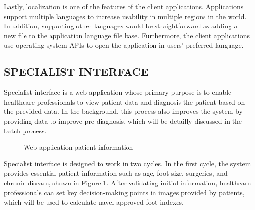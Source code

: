 Lastly, localization is one of the features of the client applications. Applications support multiple languages to increase usability in multiple regions in the world. In addition, supporting other languages would be straightforward as adding a new file to the application language file base. Furthermore, the client applications use operating system APIs to open the application in users' preferred language.

\subsection{SPECIALIST INTERFACE} \label{sec:SpecialistInterface}

Specialist interface is a web application whose primary purpose is to enable healthcare professionals to view patient data and diagnosis the patient based on the provided data. In the background, this process also improves the system by providing data to improve pre-diagnosis, which will be detailly discussed in the batch process. 

\begin{figure}[htbp]
\centering
{}
\caption{Web application patient information}
\label{fig:WebApplicationPatientInfo}
\end{figure}

Specialist interface is designed to work in two cycles. In the first cycle, the system provides essential patient information such as age, foot size, surgeries, and chronic disease, shown in Figure \ref{fig:WebApplicationPatientInfo}. After validating initial information, healthcare professionals can set key decision-making points in images provided by patients, which will be used to calculate navel-approved foot indexes. 

